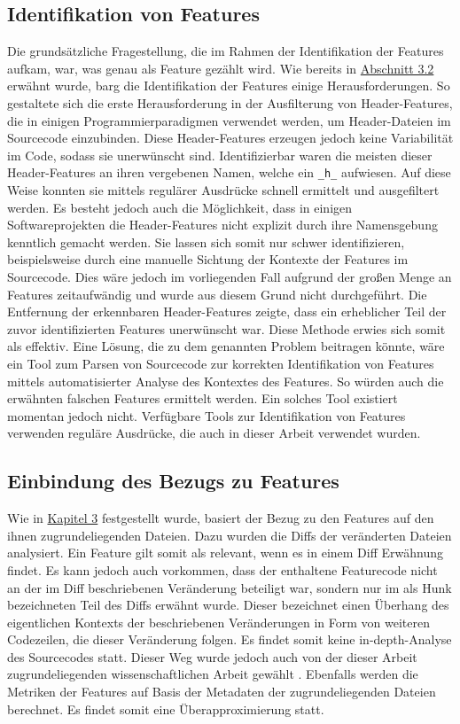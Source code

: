 \subsection*{Identifikation von Features}

Die grundsätzliche Fragestellung, die im Rahmen der Identifikation der Features aufkam, war, was genau als Feature gezählt wird. Wie bereits in \hyperref[construction]{Abschnitt 3.2} erwähnt wurde, barg die Identifikation der Features einige Herausforderungen. So gestaltete sich die erste Herausforderung in der Ausfilterung von \glqq Header-Features\grqq{}, die in einigen Programmierparadigmen verwendet werden, um Header-Dateien im Sourcecode einzubinden. Diese Header-Features erzeugen jedoch keine Variabilität im Code, sodass sie unerwünscht sind. Identifizierbar waren die meisten dieser Header-Features an ihren vergebenen Namen, welche ein \texttt{\_h\_} aufwiesen. Auf diese Weise konnten sie mittels regulärer Ausdrücke schnell ermittelt und ausgefiltert werden. Es besteht jedoch auch die Möglichkeit, dass in einigen Softwareprojekten die Header-Features nicht explizit durch ihre Namensgebung kenntlich gemacht werden. Sie lassen sich somit nur schwer identifizieren, beispielsweise durch eine manuelle Sichtung der Kontexte der Features im Sourcecode. Dies wäre jedoch im vorliegenden Fall aufgrund der großen Menge an Features zeitaufwändig und wurde aus diesem Grund nicht durchgeführt. Die Entfernung der erkennbaren Header-Features zeigte, dass ein erheblicher Teil der zuvor identifizierten Features unerwünscht war. Diese Methode erwies sich somit als effektiv.
Eine Lösung, die zu dem genannten Problem beitragen könnte, wäre ein Tool zum Parsen von Sourcecode zur korrekten Identifikation von Features mittels automatisierter Analyse des Kontextes des Features. So würden auch die erwähnten \glqq falschen\grqq{} Features ermittelt werden. Ein solches Tool existiert momentan jedoch nicht. Verfügbare Tools zur Identifikation von Features verwenden reguläre Ausdrücke, die auch in dieser Arbeit verwendet wurden.

\subsection*{Einbindung des Bezugs zu Features}
Wie in \hyperref[dataset-creation]{Kapitel 3} festgestellt wurde, basiert der Bezug zu den Features auf den ihnen zugrundeliegenden Dateien. Dazu wurden die Diffs der veränderten Dateien analysiert. Ein Feature gilt somit als relevant, wenn es in einem Diff Erwähnung findet. Es kann jedoch auch vorkommen, dass der enthaltene Featurecode nicht an der im Diff beschriebenen Veränderung beteiligt war, sondern nur im als \glqq Hunk\grqq{} bezeichneten Teil des Diffs erwähnt wurde. Dieser bezeichnet einen Überhang des eigentlichen Kontexts der beschriebenen Veränderungen in Form von weiteren Codezeilen, die dieser Veränderung folgen. Es findet somit keine \glqq in-depth\grqq -Analyse des Sourcecodes statt. Dieser Weg wurde jedoch auch von der dieser Arbeit zugrundeliegenden wissenschaftlichen Arbeit gewählt \cite{Queiroz2016}. Ebenfalls werden die Metriken der Features auf Basis der Metadaten der zugrundeliegenden Dateien berechnet. Es findet somit eine Überapproximierung statt.

